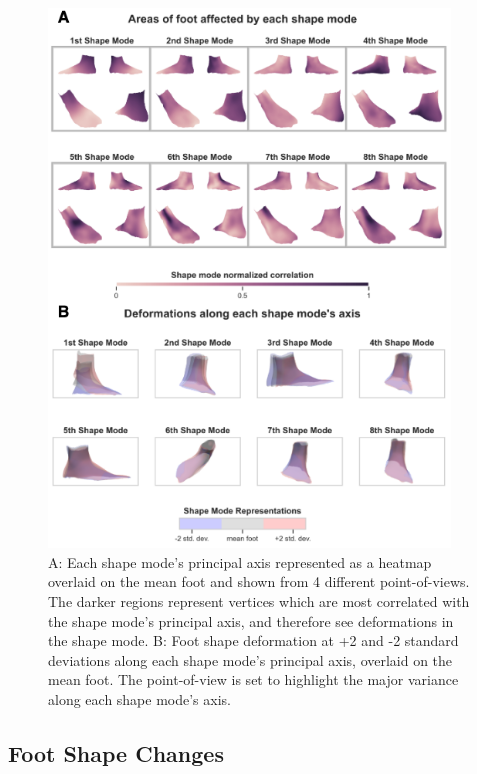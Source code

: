 \documentclass[defaultstyle,11pt]{thesis}
\begin{document}
\hypertarget{fig:pca_overlay}{%
\begin{figure}
\centering
\includegraphics[width=0.95\textwidth,height=\textheight]{../fig/SA2/PC_Var_Quad.png}
\caption[{Shape mode variance locations and magnitude}]{A: Each shape mode's principal axis represented as a heatmap overlaid on the mean foot and shown from 4 different point-of-views. The darker regions represent vertices which are most correlated with the shape mode's principal axis, and therefore see deformations in the shape mode. B: Foot shape deformation at +2 and -2 standard deviations along each shape mode's principal axis, overlaid on the mean foot. The point-of-view is set to highlight the major variance along each shape mode's axis.}
\label{fig:pca_overlay}
\end{figure}
}

\hypertarget{foot-shape-changes}{%
\subsection{Foot Shape Changes}\label{foot-shape-changes}}
\end{document}
